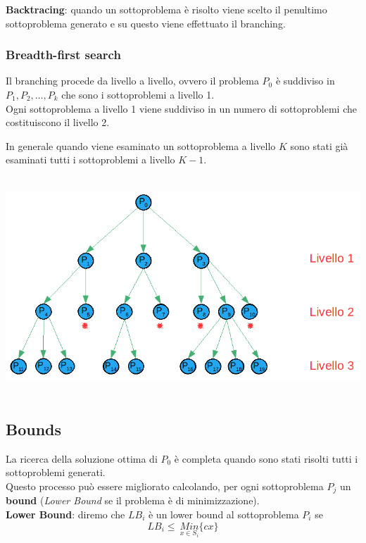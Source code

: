 \textbf{Backtracing}: quando un sottoproblema è risolto viene scelto il penultimo sottoproblema generato e su questo viene effettuato il branching.

\subsubsection{Breadth-first search}
Il branching procede da livello a livello, ovvero il problema $P_{0}$ è suddiviso in $P_{1},P_{2},\dots,P_{k}$ che sono i sottoproblemi a livello 1.\\
Ogni sottoproblema a livello 1 viene suddiviso in un numero di sottoproblemi che costituiscono il livello 2.

In generale quando viene esaminato un sottoproblema a livello $K$ sono stati già esaminati tutti i sottoproblemi a livello $K-1$.
\clearpage
\begin{center}
	\includegraphics[height=8.2cm]{images/graph18.png}
\end{center}

\subsection{Bounds}
La ricerca della soluzione ottima di $P_{0}$ è completa quando sono stati risolti tutti i sottoproblemi generati.\\
Questo processo può essere migliorato calcolando, per ogni sottoproblema $P_{j}$ un \textbf{bound} (\textit{Lower Bound} se il problema è di minimizzazione).\\

\textbf{Lower Bound}: diremo che $LB_{i}$ è un lower bound al sottoproblema $P_{i}$ se
\begin{equation*}
LB_{i}\le\ \underset{x\in S_{i}}{Min}\{cx\}
\end{equation*}

